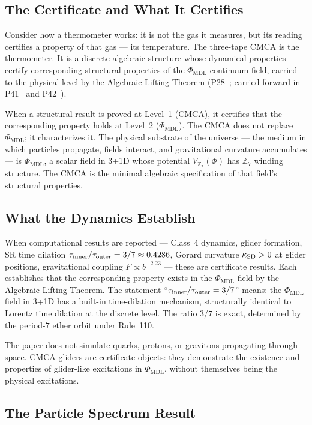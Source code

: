 \documentclass[11pt]{article}
\theoremstyle{remark}
\newcommand{\PHIMDL}{\Phi_{\mathrm{MDL}}}
\newcommand{\ZS}{\mathbb{Z}_7}
\newcommand{\CMCA}{\text{CMCA}}
\newcommand{\taucratio}{\tau_{\rm inner}/\tau_{\rm outer}}
\begin{document}
\subsection{The Certificate and What It Certifies}

Consider how a thermometer works: it is not the gas it measures, but its
reading certifies a property of that gas — its temperature. The three-tape
$\CMCA$ is the thermometer. It is a discrete algebraic structure whose
dynamical properties certify corresponding structural properties of the
$\PHIMDL$ continuum field, carried to the physical level by the Algebraic
Lifting Theorem (P28~\cite{SpivackCompUniversality}; carried forward in
P41~\cite{SpivackCMCA} and P42~\cite{SpivackPhiMDLField}).

When a structural result is proved at Level~1 ($\CMCA$), it certifies that the
corresponding property holds at Level~2 ($\PHIMDL$). The $\CMCA$ does not
replace $\PHIMDL$; it characterizes it. The physical substrate of the universe
— the medium in which particles propagate, fields interact, and gravitational
curvature accumulates — is $\PHIMDL$, a scalar field in 3+1D whose
potential $V_{\ZS}(\Phi)$ has $\ZS$ winding structure. The $\CMCA$ is the
minimal algebraic specification of that field's structural properties.

\subsection{What the Dynamics Establish}

When computational results are reported — Class~4 dynamics, glider formation,
SR time dilation $\taucratio = 3/7 \approx 0.4286$, Gorard curvature $\kappa_{\rm SD} > 0$
at glider positions, gravitational coupling $F \propto b^{-2.23}$ — these are
certificate results. Each establishes that the corresponding property
exists in the $\PHIMDL$ field by the Algebraic Lifting Theorem. The
statement ``$\taucratio = 3/7$'' means: the $\PHIMDL$ field in 3+1D has a
built-in time-dilation mechanism, structurally identical to Lorentz time
dilation at the discrete level.  The ratio $3/7$ is exact, determined by the
period-$7$ ether orbit under Rule~110.

The paper does not simulate quarks, protons, or gravitons propagating through
space. $\CMCA$ gliders are certificate objects: they demonstrate the
existence and properties of glider-like excitations in $\PHIMDL$, without
themselves being the physical excitations.

\subsection{The Particle Spectrum Result}
\end{document}
